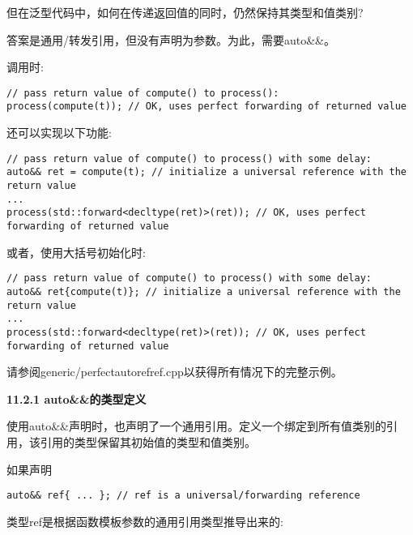 但在泛型代码中，如何在传递返回值的同时，仍然保持其类型和值类别?\par

答案是通用/转发引用，但没有声明为参数。为此，需要auto\&\&。\par

调用时:\par

\begin{lstlisting}[caption={}]
// pass return value of compute() to process():
process(compute(t)); // OK, uses perfect forwarding of returned value
\end{lstlisting}

还可以实现以下功能:\par

\begin{lstlisting}[caption={}]
// pass return value of compute() to process() with some delay:
auto&& ret = compute(t); // initialize a universal reference with the return value
...
process(std::forward<decltype(ret)>(ret)); // OK, uses perfect forwarding of returned value
\end{lstlisting}

或者，使用大括号初始化时:\par

\begin{lstlisting}[caption={}]
// pass return value of compute() to process() with some delay:
auto&& ret{compute(t)}; // initialize a universal reference with the return value
...
process(std::forward<decltype(ret)>(ret)); // OK, uses perfect forwarding of returned value
\end{lstlisting}

请参阅generic/perfectautorefref.cpp以获得所有情况下的完整示例。\par

\hspace*{\fill} \par %
\textbf{11.2.1 auto\&\&的类型定义}

使用auto\&\&声明时，也声明了一个通用引用。定义一个绑定到所有值类别的引用，该引用的类型保留其初始值的类型和值类别。\par

如果声明\par

\begin{lstlisting}[caption={}]
auto&& ref{ ... }; // ref is a universal/forwarding reference
\end{lstlisting}

类型ref是根据函数模板参数的通用引用类型推导出来的:\par

